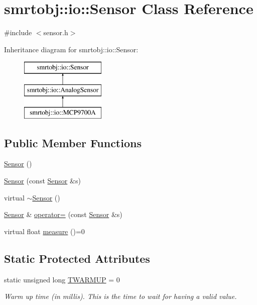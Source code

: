\hypertarget{classsmrtobj_1_1io_1_1_sensor}{}\section{smrtobj\+:\+:io\+:\+:Sensor Class Reference}
\label{classsmrtobj_1_1io_1_1_sensor}


{\ttfamily \#include $<$sensor.\+h$>$}

Inheritance diagram for smrtobj\+:\+:io\+:\+:Sensor\+:\begin{figure}[H]
\begin{center}
\leavevmode
\includegraphics[height=3.000000cm]{classsmrtobj_1_1io_1_1_sensor}
\end{center}
\end{figure}
\subsection*{Public Member Functions}
\begin{DoxyCompactItemize}
\item 
\hyperlink{classsmrtobj_1_1io_1_1_sensor_a342d6d11ef572c8cba92cb76fb1a294b}{Sensor} ()
\item 
\hyperlink{classsmrtobj_1_1io_1_1_sensor_a24ab582f46dbd81e9e7c5b1b94f719bc}{Sensor} (const \hyperlink{classsmrtobj_1_1io_1_1_sensor}{Sensor} \&s)
\item 
virtual \hyperlink{classsmrtobj_1_1io_1_1_sensor_aee8c70e7ef05ce65e7ee33686b5d7db2}{$\sim$\+Sensor} ()
\item 
\hyperlink{classsmrtobj_1_1io_1_1_sensor}{Sensor} \& \hyperlink{classsmrtobj_1_1io_1_1_sensor_aa3297032fa0b0048e497541affd923f2}{operator=} (const \hyperlink{classsmrtobj_1_1io_1_1_sensor}{Sensor} \&s)
\item 
virtual float \hyperlink{classsmrtobj_1_1io_1_1_sensor_aa774a26ce0ca79bf9c76c3cab5336c4b}{measure} ()=0
\end{DoxyCompactItemize}
\subsection*{Static Protected Attributes}
\begin{DoxyCompactItemize}
\item 
\hypertarget{classsmrtobj_1_1io_1_1_sensor_adfb2f64d3363a9bd4d164a4a45fb9829}{}static unsigned long \hyperlink{classsmrtobj_1_1io_1_1_sensor_adfb2f64d3363a9bd4d164a4a45fb9829}{T\+W\+A\+R\+M\+U\+P} = 0\label{classsmrtobj_1_1io_1_1_sensor_adfb2f64d3363a9bd4d164a4a45fb9829}

\begin{DoxyCompactList}\small\item\em Warm up time (in millis). This is the time to wait for having a valid value. \end{DoxyCompactList}\end{DoxyCompactItemize}


